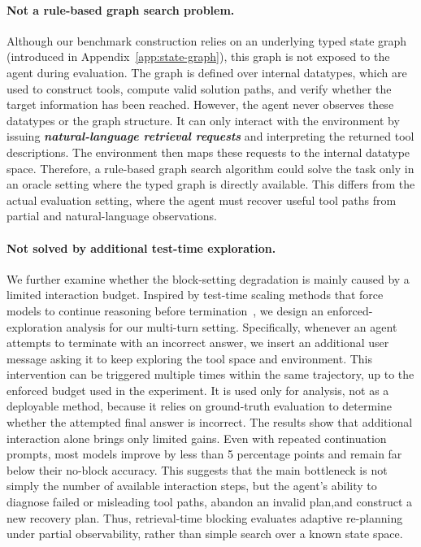 \documentclass{llmxive}
\begin{document}
\paragraph{Not a rule-based graph search problem.}
Although our benchmark construction relies on an underlying typed state graph (introduced in Appendix~\ref{app:state-graph}), this graph is not exposed to the agent during evaluation. 
The graph is defined over internal datatypes, which are used to construct tools, compute valid solution paths, and verify whether the target information has been reached. 
However, the agent never observes these datatypes or the graph structure. 
It can only interact with the environment by issuing \textit{\textbf{natural-language retrieval requests}} and interpreting the returned tool descriptions. 
The environment then maps these requests to the internal datatype space. 
Therefore, a rule-based graph search algorithm could solve the task only in an oracle setting where the typed graph is directly available. 
This differs from the actual evaluation setting, where the agent must recover useful tool paths from partial and natural-language observations.

\paragraph{Not solved by additional test-time exploration.}
We further examine whether the block-setting degradation is mainly caused by a limited interaction budget.
Inspired by test-time scaling methods that force models to continue reasoning before termination~\citep{s1}, we design an enforced-exploration analysis for our multi-turn setting.
Specifically, whenever an agent attempts to terminate with an incorrect answer, we insert an additional user message asking it to keep exploring the tool space and environment.
This intervention can be triggered multiple times within the same trajectory, up to the enforced budget used in the experiment.
It is used only for analysis, not as a deployable method, because it relies on ground-truth evaluation to determine whether the attempted final answer is incorrect.
The results show that additional interaction alone brings only limited gains.
Even with repeated continuation prompts, most models improve by less than 5 percentage points and remain far below their no-block accuracy.
This suggests that the main bottleneck is not simply the number of available interaction steps, but the agent's ability to diagnose failed or misleading tool paths, abandon an invalid plan,and construct a new recovery plan.
Thus, retrieval-time blocking evaluates adaptive re-planning under partial observability, rather than simple search over a known state space.
\end{document}
